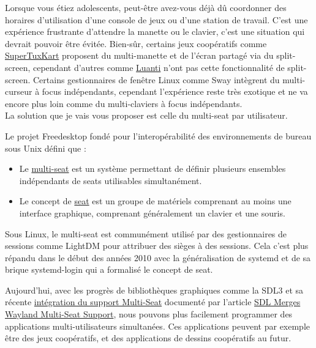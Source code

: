 \documentclass[a4paper,11pt]{article}
\title{
  \blogtitle{Du Multi-Seat Linux}
}
\author{}
\date{}
\begin{document}

\maketitle

\thispagestyle{first}
\begin{blogmain}
Lorsque vous étiez adolescents, peut-être avez-vous déjà dû coordonner des horaires d'utilisation d'une console de jeux ou d'une station de travail.
C'est une expérience frustrante d'attendre la manette ou le clavier, c'est une situation qui devrait pouvoir être évitée.
Bien-sûr, certains jeux coopératifs comme \href{https://supertuxkart.net/Main_Page.html}{SuperTuxKart} proposent du multi-manette et de l’écran partagé via du split-screen, cependant d'autres comme \href{https://www.luanti.org/fr/}{Luanti} n'ont pas cette fonctionnalité de split-screen.
Certains gestionnaires de fenêtre Linux comme Sway intègrent du multi-curseur à focus indépendants, cependant l'expérience reste très exotique et ne va encore plus loin comme du multi-claviers à focus indépendants.
\\
La solution que je vais vous proposer est celle du multi-seat par utilisateur.


Le projet Freedesktop fondé pour l'interopérabilité des environnements de bureau sous Unix défini que :
\begin{itemize}
  \item Le \href{https://www.freedesktop.org/wiki/Software/systemd/multiseat#definitionofterms}{multi-seat} est un système permettant de définir plusieurs ensembles indépendants de seats utilisables simultanément.
  \item Le concept de \href{https://www.freedesktop.org/wiki/Software/systemd/multiseat#definitionofterms}{seat} est un groupe de matériels comprenant au moins une interface graphique, comprenant généralement un clavier et une souris.
\end{itemize}

Sous Linux, le multi-seat est communément utilisé par des gestionnaires de sessions comme LightDM pour attribuer des sièges à des sessions.
Cela c'est plus répandu dans le début des années 2010 avec la généralisation de systemd et de sa brique systemd-login qui a formalisé le concept de seat.

Aujourd'hui, avec les progrès de bibliothèques graphiques comme la SDL3 et sa récente \href{https://github.com/libsdl-org/SDL/pull/12626}{intégration du support Multi-Seat} documenté par l'article \href{https://www.phoronix.com/news/SDL-Merges-Wayland-Multi-Seat}{SDL Merges Wayland Multi-Seat Support}, nous pouvons plus facilement programmer des applications multi-utilisateurs simultanées.
Ces applications peuvent par exemple être des jeux coopératifs, et des applications de dessins coopératifs au futur.


\end{blogmain}
\end{document}

